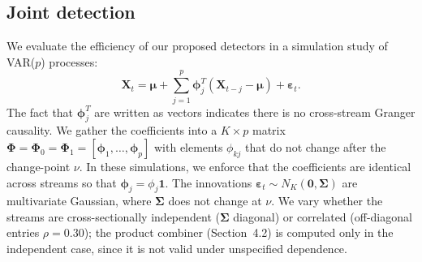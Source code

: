 %
%
%



\subsection{Joint detection}

We evaluate the efficiency of our proposed detectors in a simulation study of VAR($p$) processes:
\[
\bm{X}_t = \bm{\mu} + \sum_{j=1}^p \bm{\phi}_j^T (\bm{X}_{t-j} - \bm{\mu}) + \bm{\varepsilon}_t.
\]
The fact that $\bm{\phi}_j^T$ are written as vectors indicates there is no cross-stream Granger
causality. We gather the coefficients into a $K \times p$ matrix
$\bm{\Phi} = \bm{\Phi}_0 = \bm{\Phi}_1 = [\bm{\phi}_1, \ldots, \bm{\phi}_p]$ with elements
$\phi_{kj}$ that do not change after the change-point $\nu$. In these simulations, we enforce
that the coefficients are identical across streams so that $\bm{\phi}_j = \phi_j \bm{1}$. The
innovations $\bm{\varepsilon}_t \sim N_K(\bm{0}, \bm{\Sigma})$ are multivariate Gaussian, where
$\bm{\Sigma}$ does not change at $\nu$. We vary whether the streams are cross-sectionally
independent ($\bm{\Sigma}$ diagonal) or correlated (off-diagonal entries $\rho = 0.30$); the
product combiner (Section~4.2) is computed only in the independent case, since it is not valid
under unspecified dependence.

